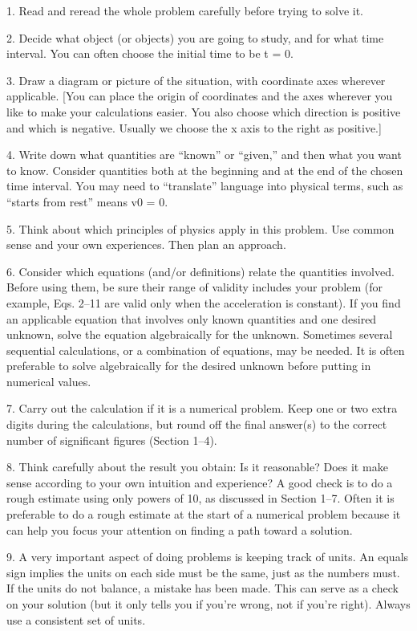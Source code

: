 \documentclass{extarticle}
\begin{document}
\begin{tcolorbox}[enhanced jigsaw,sharp corners,coltext=black,colback=BurntOrange!25!white,boxrule=0pt,breakable,size=minimal]
1. Read and reread the whole problem carefully before trying to solve it.  

2. Decide what object (or objects) you are going to study, and for what time interval. You can often choose the initial time to be t = 0.  

3. Draw a diagram or picture of the situation, with coordinate axes wherever applicable. [You can place the origin of coordinates and the axes wherever you like to make your calculations easier. You also choose which direction is positive and which is negative. Usually we choose the x axis to the right as positive.]  

4. Write down what quantities are “known” or “given,” and then what you want to know. Consider quantities both at the beginning and at the end of the chosen time interval. You may need to “translate” language into physical terms, such as “starts from rest” means v0 = 0.  

5. Think about which principles of physics apply in this problem. Use common sense and your own experiences. Then plan an approach.  

6. Consider which equations (and/or definitions) relate the quantities involved. Before using them, be sure their range of validity includes your problem (for example, Eqs. 2–11 are valid only when the acceleration is constant). If you find an applicable  equation that involves only known quantities and one desired unknown, solve the equation algebraically for the unknown. Sometimes several sequential calculations, or a combination of equations, may be needed. It is often preferable to solve algebraically for the desired unknown before putting in numerical values.  

7. Carry out the calculation if it is a numerical problem. Keep one or two extra digits during the calculations, but round off the final answer(s) to the correct number of significant figures (Section 1–4).  

8. Think carefully about the result you obtain: Is it reasonable? Does it make sense according to your own intuition and experience? A good check is to do a rough estimate using only powers of 10, as discussed in Section 1–7. Often it is preferable to do a rough estimate at the start of a numerical problem because it can help you focus your attention on finding a path toward a solution.  

9. A very important aspect of doing problems is keeping track of units. An equals sign implies the units on each side must be the same, just as the numbers must. If the units do not balance, a mistake has been made. This can serve as a check on your solution (but it only tells you if you’re wrong, not if you’re right). Always use a consistent set of units.







\end{tcolorbox}
\end{document}
